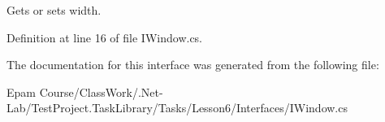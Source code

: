 Gets or sets width. 



Definition at line 16 of file I\+Window.\+cs.



The documentation for this interface was generated from the following file\+:\begin{DoxyCompactItemize}
\item 
Epam Course/\+Class\+Work/.\+Net-\/\+Lab/\+Test\+Project.\+Task\+Library/\+Tasks/\+Lesson6/\+Interfaces/I\+Window.\+cs\end{DoxyCompactItemize}

